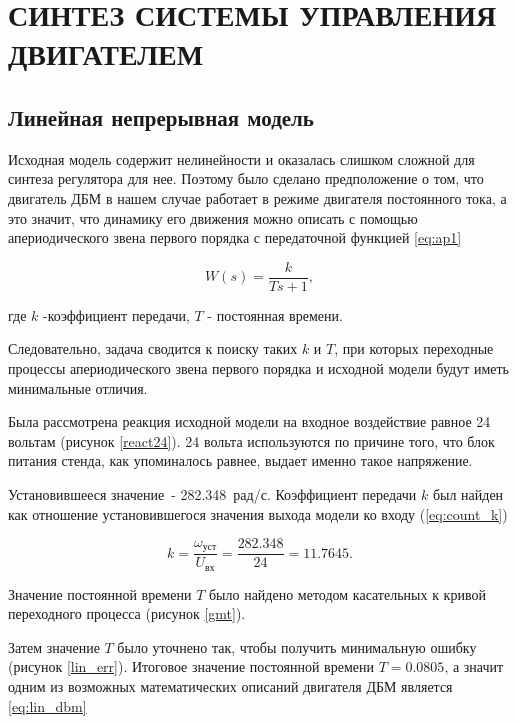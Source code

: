 \section{СИНТЕЗ СИСТЕМЫ УПРАВЛЕНИЯ ДВИГАТЕЛЕМ}

\subsection{Линейная непрерывная модель}

Исходная модель содержит нелинейности и оказалась слишком сложной для синтеза регулятора для нее.
Поэтому было сделано предположение о том, что двигатель ДБМ в нашем случае работает
в режиме двигателя постоянного тока, а это значит, что динамику его движения можно
описать с помощью апериодического звена первого порядка с передаточной функцией \ref{eq:ap1}

\begin{equation}
  W(s)=\frac{k}{Ts+1},
  \label{eq:ap1}
\end{equation}

где $k$ -коэффициент передачи, $T$ - постоянная времени.

Следовательно, задача сводится к поиску таких $k$ и $T$, при которых переходные процессы
апериодического звена первого порядка и исходной модели будут иметь минимальные отличия.


Была рассмотрена реакция исходной модели на входное воздействие равное 24 вольтам (рисунок \ref{react24}).
24 вольта используются по причине того, что блок питания стенда, как упоминалось равнее, выдает 
именно такое напряжение.

Установившееся значение~- 282.348~рад/с.
Коэффициент передачи $k$ был найден как отношение установившегося значения выхода модели ко входу (\ref{eq:count_k})

\begin{equation}
  k = \frac{\omega_{\text{уст}}}{U_{\text{вх}}} = \frac{282.348}{24} = 11.7645.
  \label{eq:count_k}
\end{equation}

Значение постоянной времени $T$ было найдено методом касательных к кривой переходного
процесса (рисунок \ref{gmt}).


Затем значение $T$ было уточнено так, чтобы получить минимальную ошибку (рисунок \ref{lin_err}).
Итоговое значение постоянной времени $T = 0.0805$, а значит одним из возможных
математических описаний двигателя ДБМ является \ref{eq:lin_dbm}

